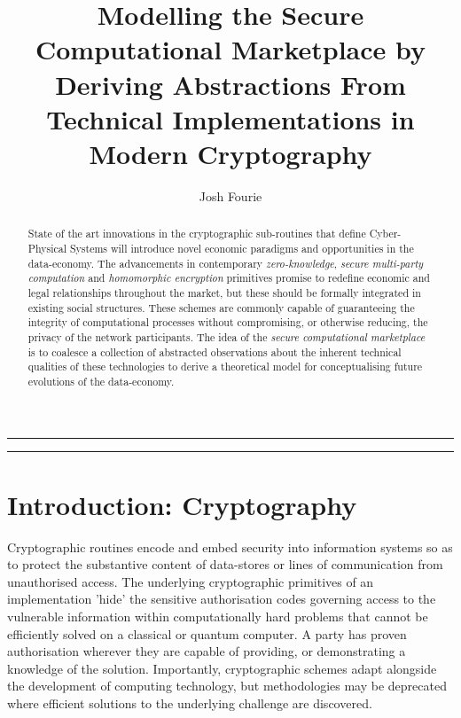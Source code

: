 \documentclass[twocolumn]{scrartcl}
\title{Modelling the Secure Computational Marketplace by Deriving Abstractions From Technical Implementations in Modern Cryptography}
\author{Josh Fourie}
\date{}
\begin{document}
\maketitle


\noindent \rule{7.08cm}{1pt}
\begin{abstract}
	State of the art innovations in the cryptographic sub-routines that define Cyber-Physical Systems will introduce novel economic paradigms and opportunities in the data-economy. The advancements in contemporary \textit{zero-knowledge}, \textit{secure multi-party computation} and \textit{homomorphic encryption} primitives promise to redefine economic and legal relationships throughout the market, but these should be formally integrated in existing social structures. These schemes are commonly capable of guaranteeing the integrity of computational processes without compromising, or otherwise reducing, the privacy of the network participants. The idea of the \textit{secure computational marketplace} is to coalesce a collection of abstracted observations about the inherent technical qualities of these technologies to derive a theoretical model for conceptualising future evolutions of the data-economy.
	
\end{abstract}
\noindent \rule{7.08cm}{0.5pt}

\section{Introduction: Cryptography}
Cryptographic routines encode and embed security into information systems so as to protect the substantive content of data-stores or lines of communication from unauthorised access. The underlying cryptographic primitives of an implementation 'hide' the sensitive authorisation codes governing access to the vulnerable information within computationally hard problems that cannot be efficiently solved on a classical or quantum computer. A party has proven authorisation wherever they are capable of providing, or demonstrating a knowledge of the solution. Importantly, cryptographic schemes adapt alongside the development of computing technology, but methodologies may be deprecated where efficient solutions to the underlying challenge are discovered.
\end{document}
